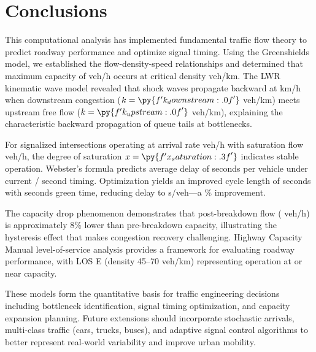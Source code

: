 \documentclass[11pt,a4paper]{article}
\begin{document}
\section{Conclusions}

This computational analysis has implemented fundamental traffic flow theory to predict roadway performance and optimize signal timing. Using the Greenshields model, we established the flow-density-speed relationships and determined that maximum capacity of  veh/h occurs at critical density  veh/km. The LWR kinematic wave model revealed that shock waves propagate backward at  km/h when downstream congestion ($k = \py{f'{k_downstream:.0f}'}$ veh/km) meets upstream free flow ($k = \py{f'{k_upstream:.0f}'}$ veh/km), explaining the characteristic backward propagation of queue tails at bottlenecks.

For signalized intersections operating at arrival rate  veh/h with saturation flow  veh/h, the degree of saturation $x = \py{f'{x_saturation:.3f}'}$ indicates stable operation. Webster's formula predicts average delay of  seconds per vehicle under current / second timing. Optimization yields an improved cycle length of  seconds with  seconds green time, reducing delay to  s/veh—a \% improvement.

The capacity drop phenomenon demonstrates that post-breakdown flow ( veh/h) is approximately 8\% lower than pre-breakdown capacity, illustrating the hysteresis effect that makes congestion recovery challenging. Highway Capacity Manual level-of-service analysis provides a framework for evaluating roadway performance, with LOS E (density 45–70 veh/km) representing operation at or near capacity.

These models form the quantitative basis for traffic engineering decisions including bottleneck identification, signal timing optimization, and capacity expansion planning. Future extensions should incorporate stochastic arrivals, multi-class traffic (cars, trucks, buses), and adaptive signal control algorithms to better represent real-world variability and improve urban mobility.
\end{document}

